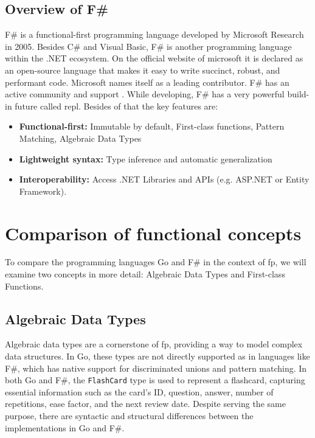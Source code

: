     \section{Overview of F\#}\label{sec:fsharp-overview}
    F\# is a functional-first programming language developed by Microsoft Research in 2005.
    Besides C\# and Visual Basic, F\# is another programming language within the .NET ecosystem. On the official website of microsoft it is declared as an open-source language that makes it easy to write succinct, robust, and performant code. Microsoft names itself as a leading contributor. F\# has an active community and support \cite{Fsharpfoundation}.
    While developing, F\# has a very powerful build-in future called \ac{repl}. Besides of that the key features are:
    \begin{itemize}
        \item \textbf{Functional-first:} Immutable by default, First-class functions, Pattern Matching, Algebraic Data Types 
        \item \textbf{Lightweight syntax:} Type inference and automatic generalization
        \item \textbf{Interoperability:} Access .NET Libraries and APIs (e.g. ASP.NET or Entity Framework). 
    \end{itemize}
    \cite{Dotnet}
    \cite{Keyfeaturesfsharp}
    


\chapter{Comparison of functional concepts}\label{chap:comparison}
To compare the programming languages Go and F\# in the context of \ac{fp}, we will examine two concepts in more detail: Algebraic Data Types and First-class Functions. 

    \section{Algebraic Data Types}\label{sec:algebraic-data-types}

    Algebraic data types are a cornerstone of \ac{fp}, providing a way to model complex data structures. In Go, these types are not directly supported as in languages like F\#, which has native support for discriminated unions and pattern matching. In both Go and F\#, the \texttt{FlashCard} type is used to represent a flashcard, capturing essential information such as the card's ID, question, answer, number of repetitions, ease factor, and the next review date. Despite serving the same purpose, there are syntactic and structural differences between the implementations in Go and F\#.

